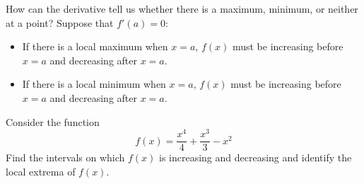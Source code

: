 How can the derivative tell us whether there is a maximum, minimum, or
neither at a point? Suppose that $f'(a)=0$:
\begin{itemize}
\item If there is a local maximum when $x=a$, $f(x)$ must be
  increasing before $x=a$ and decreasing after $x=a$.
\item If there is a local minimum when $x=a$, $f(x)$ must be
  increasing before $x=a$ and decreasing after $x=a$.
\end{itemize}

\begin{example}
Consider the function 
\[
f(x) = \frac{x^4}{4}+\frac{x^3}{3}-x^2
\]
Find the intervals on which $f(x)$ is increasing and decreasing and
identify the local extrema of $f(x)$.
\end{example}


